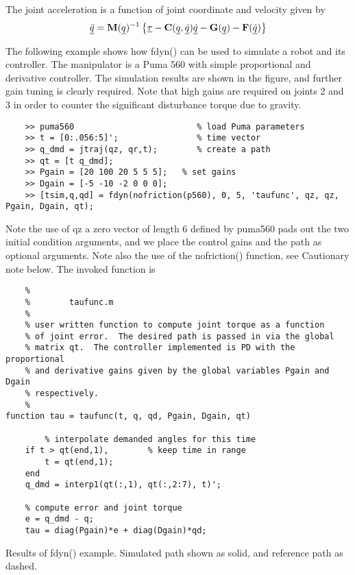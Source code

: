 \documentclass{article}
\newcommand{\malg}[1]{\hskip -1.25in 
{\hbox{\makebox[1.25in][l]{\Refon Algorithm}}}{#1}\vskip 0.25in}
\newcommand{\example}[1]{\hskip -1.25in 
{\hbox{\makebox[1.25in][l]{\Refon Example}}}{#1}\vskip 0.25in}
\newcommand{\var}[1]{{\vtt #1}}
\renewcommand{\vec}[1]{\underline{#1}}
\begin{document}
\malg{The joint acceleration is a function of joint coordinate and velocity given by
\[
\vec{\ddot{q}} = {\bf M}(\vec{q})^{-1} \left\{ \vec{\tau} - {\bf C}(\vec{q}, \vec{\dot{q}}) \vec{\dot{q}} - {\bf G}(\vec{q}) - {\bf F}(\vec{\dot{q}}) \right\}
\]}

\example{The following example shows how \var{fdyn()} can be used to simulate a
robot and its controller.  The manipulator is a Puma 560 with simple
proportional and  derivative controller.  The simulation results are shown in
the figure, and further gain tuning is clearly required.  Note that high gains
are required on joints 2 and 3 in order to counter the significant disturbance
torque due
to gravity.
}

{\small
\begin{verbatim}
    >> puma560                         % load Puma parameters
    >> t = [0:.056:5]';                % time vector
    >> q_dmd = jtraj(qz, qr,t);        % create a path
    >> qt = [t q_dmd];
    >> Pgain = [20 100 20 5 5 5];   % set gains
    >> Dgain = [-5 -10 -2 0 0 0];
    >> [tsim,q,qd] = fdyn(nofriction(p560), 0, 5, 'taufunc', qz, qz, Pgain, Dgain, qt);
\end{verbatim}}
\noindent
Note the use of \var{qz} a zero vector of length 6 defined by \var{puma560}
pads out the two initial condition arguments, and we place the control
gains and the path as optional arguments.
Note also the use of the \var{nofriction()} function, see Cautionary note below.
The invoked function is
{\small
\begin{verbatim}
    %
    %        taufunc.m
    %
    % user written function to compute joint torque as a function
    % of joint error.  The desired path is passed in via the global
    % matrix qt.  The controller implemented is PD with the proportional
    % and derivative gains given by the global variables Pgain and Dgain
    % respectively.
    %
function tau = taufunc(t, q, qd, Pgain, Dgain, qt)

        % interpolate demanded angles for this time
	if t > qt(end,1),        % keep time in range
		t = qt(end,1);
	end
	q_dmd = interp1(qt(:,1), qt(:,2:7), t)';

	% compute error and joint torque
	e = q_dmd - q;
	tau = diag(Pgain)*e + diag(Dgain)*qd;
\end{verbatim}}

{\centerline{}
Results of \var{fdyn()} example.  Simulated path shown as
solid, and reference path as dashed.}
\end{document}
